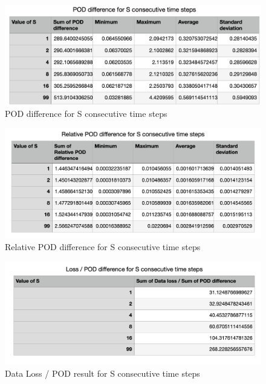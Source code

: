 \begin{figure}[H]
    \caption{POD difference for S consecutive time steps}
    \includegraphics[scale=0.6]{Report LaTeX/figures/mantle_convection_images/further_testings/POD_table.png}
\end{figure}

\begin{figure}[H]
    \caption{Relative POD difference for S consecutive time steps}
    \includegraphics[scale=0.6]{Report LaTeX/figures/mantle_convection_images/further_testings/Relative_POD_table.png}
\end{figure}

\begin{figure}[H]
    \caption{Data Loss / POD result for S consecutive time steps}
    \includegraphics[scale=0.6]{Report LaTeX/figures/mantle_convection_images/further_testings/Data_loss_POD_division_table.png}
\end{figure}






